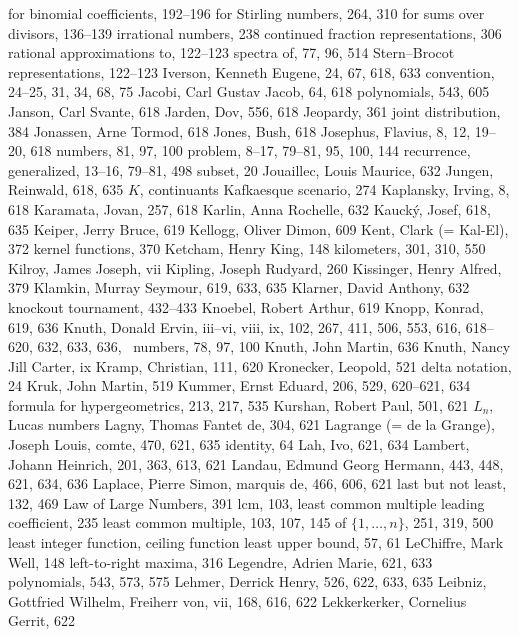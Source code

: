 \sub for binomial coefficients, 192--196
\sub for Stirling numbers, 264, 310
\sub for sums over divisors, 136--139
irrational numbers, 238
\sub continued fraction representations, 306
\sub rational approximations to, 122--123
\sub spectra of, 77, 96, 514
\sub Stern--Brocot representations, 122--123
Iverson, Kenneth Eugene, 24, 67, 618, 633
\sub convention, 24--25, 31, 34, 68, 75
\medskip
Jacobi, Carl Gustav Jacob, 64, 618
\sub polynomials, 543, 605
Janson, Carl Svante, 618
Jarden, Dov, 556, 618
Jeopardy, 361
joint distribution, 384
Jonassen, Arne Tormod, 618
Jones, Bush, 618
Josephus, Flavius, 8, 12, 19--20, 618
\sub numbers, 81, 97, 100
\sub problem, 8--17, 79--81, 95, 100, 144
\sub recurrence, generalized, 13--16, 79--81, 498
\sub subset, 20
Jouaillec, Louis Maurice, 632
Jungen, Reinwald, 618, 635
\medskip
$K$, \see continuants
Kafkaesque scenario, 274
Kaplansky, Irving, 8, 618
Karamata, Jovan, 257, 618
Karlin, Anna Rochelle, 632
Kauck\'y, Josef, 618, 635
Keiper, Jerry Bruce, 619
Kellogg, Oliver Dimon, 609
Kent, Clark (= Kal-El), 372
kernel functions, 370
Ketcham, Henry King, 148
kilometers, 301, 310, 550
Kilroy, James Joseph, vii
Kipling, Joseph Rudyard, 260
Kissinger, Henry Alfred, 379
Klamkin, Murray Seymour, 619, 633, 635
Klarner, David Anthony, 632
knockout tournament, 432--433
Knoebel, Robert Arthur, 619
Knopp, Konrad, 619, 636
Knuth, Donald Ervin, iii--vi, viii, ix, 102, 267, 411, 506, 553, 616, %
 618--620, 632, 633, 636,~\cpage
\sub numbers, 78, 97, 100
Knuth, John Martin, 636
Knuth, Nancy Jill Carter, ix
Kramp, Christian, 111, 620
Kronecker, Leopold, 521
\sub delta notation, 24
Kruk, John Martin, 519
Kummer, Ernst Eduard, 206, 529, 620--621, 634
\sub formula for hypergeometrics, 213, 217, 535
Kurshan, Robert Paul, 501, 621
\medskip
$L_n$, \see Lucas numbers
Lagny, Thomas Fantet de, 304, 621
Lagrange (= de la Grange), Joseph Louis, comte, 470, 621, 635
\sub identity, 64
Lah, Ivo, 621, 634
Lambert, Johann Heinrich, 201, 363, 613, 621
Landau, Edmund Georg Hermann, 443, 448, 621, 634, 636
Laplace, Pierre Simon, marquis de, 466, 606, 621
last but not least, 132, 469
Law of Large Numbers, 391
lcm, 103, \see least common multiple
leading coefficient, 235
least common multiple, 103, 107, 145
\sub of $\{1,\ldots,n\}$, 251, 319, 500
least integer function, \see ceiling function
least upper bound, 57, 61
LeChiffre, Mark Well, 148
left-to-right maxima, 316
Legendre, Adrien Marie, 621, 633
\sub polynomials, 543, 573, 575
Lehmer, Derrick Henry, 526, 622, 633, 635
Leibniz, Gottfried Wilhelm, Freiherr von, vii, 168, 616, 622
Lekkerkerker, Cornelius Gerrit, 622
